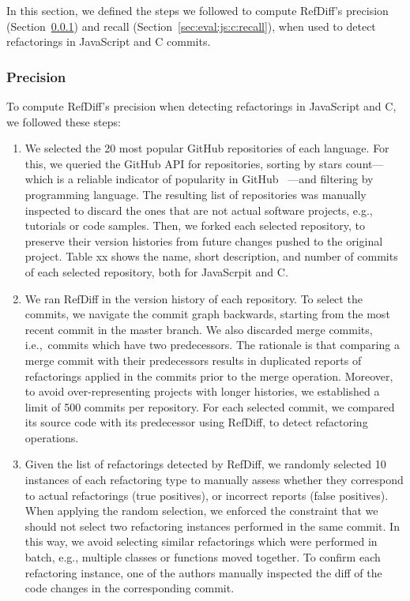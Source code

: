 In this section, we defined the steps we followed to compute RefDiff's precision (Section~\ref{sec:eval:js:c:precision})
and recall (Section~\ref{sec:eval:js:c:recall}), when used to detect refactorings in JavaScript and C commits.

\subsubsection{Precision}
\label{sec:eval:js:c:precision}


To compute RefDiff's precision when detecting refactorings in JavaScript and C, we followed these steps:

\begin{enumerate}  
\item We selected the 20 most popular GitHub repositories of each language. For this, we queried the GitHub API for repositories, sorting by stars count---which is a reliable indicator of popularity in GitHub~\cite{icsme2016,jss-2018-github-stars} ---and filtering by programming language.
The resulting list of repositories was manually inspected to discard the ones that are not actual software projects, e.g., tutorials or code samples. Then, we forked each selected repository, to preserve their version histories from future changes pushed to the original project. Table xx shows the name, short description, and number of commits of each selected repository, both for JavaScrpit and C.  

\item We ran RefDiff in the version history of each repository. To select the commits, we navigate the commit graph backwards, starting from the most recent commit in the master branch. We also discarded merge commits, i.e.,~commits which have two predecessors. The rationale is that comparing a merge commit with their predecessors results in duplicated reports of refactorings applied in the commits prior to the merge operation. Moreover, to avoid over-representing projects with longer histories, we established a limit of 500 commits per repository. For each selected commit, we compared its source code with its predecessor using RefDiff, to detect refactoring operations.

\item Given the list of refactorings detected by RefDiff, we randomly selected 10 instances of each refactoring type to manually assess whether they correspond to actual refactorings (true positives), or incorrect reports (false positives).
When applying the random selection, we enforced the constraint that we should not select two refactoring instances performed in the same commit.
In this way, we avoid selecting similar refactorings which were performed in batch, e.g., multiple classes or functions moved together.
To confirm each refactoring instance, one of the authors manually inspected the diff of the code changes in the corresponding commit.
\end{enumerate}

